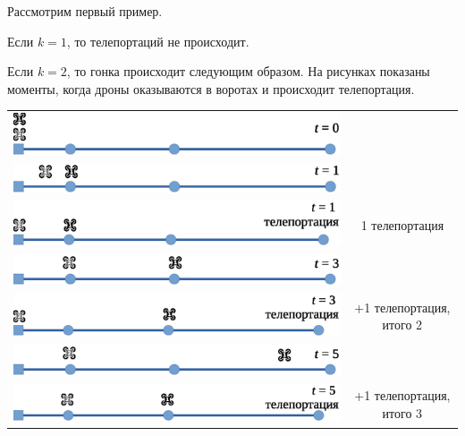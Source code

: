 Рассмотрим первый пример. 

Если $k = 1$, то телепортаций не происходит.

Если $k=2$, то гонка происходит следующим образом. На рисунках показаны моменты, когда дроны оказываются в воротах и происходит телепортация.

\medskip
\begin{center}
\begin{tabular}{cc}
\renewcommand{\arraystretch}{2}
\includegraphics[scale=0.7]{sample-2-01.eps}\\[0.8cm]
\includegraphics[scale=0.7]{sample-2-02.eps}\\[0.3cm]
\includegraphics[scale=0.7]{sample-2-03.eps}&{1 телепортация}\\[0.8cm]
\includegraphics[scale=0.7]{sample-2-04.eps}\\[0.3cm]
\includegraphics[scale=0.7]{sample-2-05.eps}&{+1 телепортация, итого 2}\\[0.8cm]
\includegraphics[scale=0.7]{sample-2-06.eps}\\[0.3cm]
\includegraphics[scale=0.7]{sample-2-07.eps}&{+1 телепортация, итого 3}\\[0.8cm]

\end{tabular}
\end{center}
